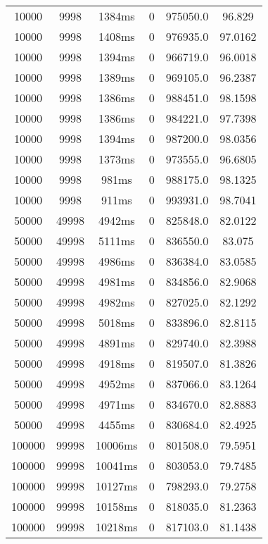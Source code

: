 \documentclass[./main.tex]{subfiles}
\begin{document}
\begin{table}
\begin{tabular}{ c | c | c | c | c | c }
        10000 & 9998 & 1384ms & 0 & 975050.0 & 96.829 \\
        10000 & 9998 & 1408ms & 0 & 976935.0 & 97.0162 \\
        10000 & 9998 & 1394ms & 0 & 966719.0 & 96.0018 \\
        10000 & 9998 & 1389ms & 0 & 969105.0 & 96.2387 \\
        10000 & 9998 & 1386ms & 0 & 988451.0 & 98.1598 \\
        10000 & 9998 & 1386ms & 0 & 984221.0 & 97.7398 \\
        10000 & 9998 & 1394ms & 0 & 987200.0 & 98.0356 \\
        10000 & 9998 & 1373ms & 0 & 973555.0 & 96.6805 \\
        10000 & 9998 & 981ms & 0 & 988175.0 & 98.1325 \\
        10000 & 9998 & 911ms & 0 & 993931.0 & 98.7041 \\
        \hline
        50000 & 49998 & 4942ms & 0 & 825848.0 & 82.0122 \\
        50000 & 49998 & 5111ms & 0 & 836550.0 & 83.075 \\
        50000 & 49998 & 4986ms & 0 & 836384.0 & 83.0585 \\
        50000 & 49998 & 4981ms & 0 & 834856.0 & 82.9068 \\
        50000 & 49998 & 4982ms & 0 & 827025.0 & 82.1292 \\
        \rowcolor{lightgray} 50000 & 49998 & 5018ms & 0 & 833896.0 & 82.8115 \\
        50000 & 49998 & 4891ms & 0 & 829740.0 & 82.3988 \\
        50000 & 49998 & 4918ms & 0 & 819507.0 & 81.3826 \\
        50000 & 49998 & 4952ms & 0 & 837066.0 & 83.1264 \\
        50000 & 49998 & 4971ms & 0 & 834670.0 & 82.8883 \\
        50000 & 49998 & 4455ms & 0 & 830684.0 & 82.4925 \\
        \hline
        100000 & 99998 & 10006ms & 0 & 801508.0 & 79.5951 \\
        100000 & 99998 & 10041ms & 0 & 803053.0 & 79.7485 \\
        100000 & 99998 & 10127ms & 0 & 798293.0 & 79.2758 \\
        100000 & 99998 & 10158ms & 0 & 818035.0 & 81.2363 \\
        100000 & 99998 & 10218ms & 0 & 817103.0 & 81.1438 \\

\end{tabular}
\end{table}
\end{document}
